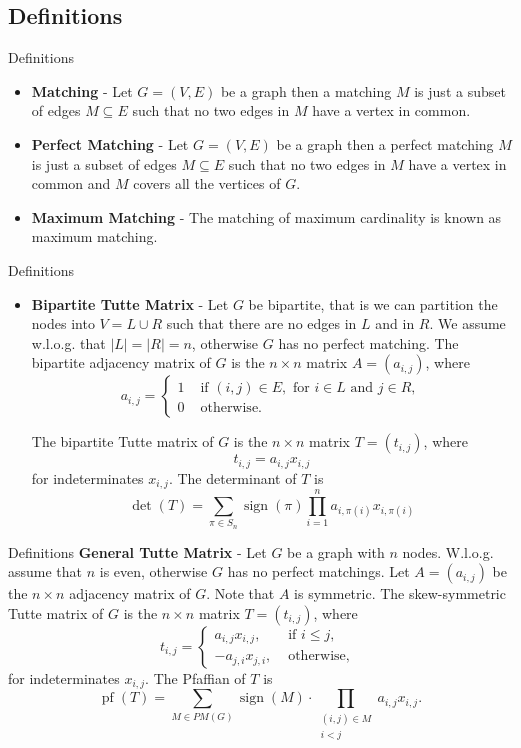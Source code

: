 \documentclass{beamer}
\begin{document}
	\subsection{Definitions}
	\begin{frame}{Definitions}
		\begin{itemize}
			\item \textbf{Matching} - Let $G=(V,E)$ be a graph then a matching $M$ is just a subset of edges $M\subseteq E$ such that no two edges in $M$ have a vertex in common.
			\item \textbf{Perfect Matching} - Let $G=(V,E)$ be a graph then a perfect matching $M$ is just a subset of edges $M\subseteq E$ such that no two edges in $M$ have a vertex in common and $M$ covers all the vertices of $G$.
			\item \textbf{Maximum Matching} - The matching of maximum cardinality is known as maximum  matching.
			\end{itemize}
		\end{frame}
	\begin{frame}{Definitions}
			\begin{itemize}
			\item \textbf{Bipartite Tutte Matrix} - Let $G$ be bipartite, that is we can partition the nodes into $V=L \cup R$ such that there are no edges in $L$ and in $R$. We assume w.l.o.g. that $|L|= |R|=n$, otherwise $G$ has no perfect matching. The bipartite adjacency matrix of $G$ is the $n \times n$ matrix $A=\left(a_{i, j}\right)$, where
			$$
			a_{i, j}= \begin{cases}1 & \text { if }(i, j) \in E, \text { for } i \in L \text { and } j \in R, \\ 0 & \text { otherwise. }\end{cases}
			$$
			
			The bipartite Tutte matrix of $G$ is the $n \times n$ matrix $T=\left(t_{i, j}\right)$, where
			$$
			t_{i, j}=a_{i, j} x_{i, j}
			$$
			for indeterminates $x_{i, j}$. The determinant of $T$ is
			$$
			\operatorname{det}(T)=\sum_{\pi \in S_n} \operatorname{sign}(\pi) \prod_{i=1}^n a_{i, \pi(i)} x_{i, \pi(i)}
			$$
		\end{itemize}
		
		
	\end{frame}
	\begin{frame}{Definitions}
		\textbf{General Tutte Matrix} - Let $G$ be a graph with $n$ nodes. W.l.o.g. assume that $n$ is even, otherwise $G$ has no perfect matchings. Let $A=\left(a_{i, j}\right)$ be the $n \times n$ adjacency matrix of $G$. Note that $A$ is symmetric. The skew-symmetric Tutte matrix of $G$ is the $n \times n$ matrix $T=\left(t_{i, j}\right)$, where
		$$
		t_{i, j}= \begin{cases}a_{i, j} x_{i, j}, & \text { if } i \leq j, \\ -a_{j, i} x_{j, i}, & \text { otherwise, }\end{cases}
		$$
		for indeterminates $x_{i, j}$. The Pfaffian of $T$ is
		$$
		\operatorname{pf}(T)=\sum_{M \in P M(G)} \operatorname{sign}(M) \cdot \prod_{\substack{(i, j) \in M \\ i<j}} a_{i, j} x_{i, j} .
		$$
	\end{frame}
\end{document}
